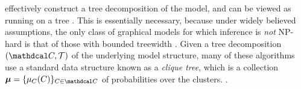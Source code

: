 \documentclass{article}
\newcommand\otodo[2][]{\todo[color=olicolor!30!white,#1]{#2}}
\begin{document}
effectively construct a tree decomposition of the model, and can be
viewed as running on a tree \parencite[\S9-11]{koller2009probabilistic}.
This is essentially necessary, because under widely believed assumptions,
the only class of graphical models
for which inference is \emph{not} NP-hard is
that of those with bounded treewidth 
\parencite{chandrasekaran2012complexity}.
%
Given a tree decomposition $(\C, \mathcal T)$ of the underlying model structure,
many of these algorithms
use a standard data structure
known as a \emph{clique tree}, which
%
is a collection
$\bmu = \{\mu_C(C)\}_{ C \in \C}$ 
of probabilities over the clusters.
\parencite[see][\S10]{koller2009probabilistic}.
\end{document}
